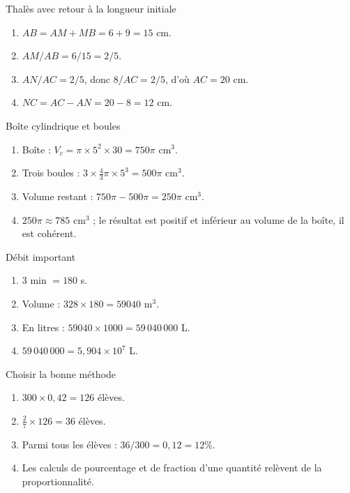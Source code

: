 \documentclass[11pt,a4paper]{article}
\newcounter{corr}
\begin{document}
\begin{corrbox}{Thalès avec retour à la longueur initiale}
\begin{enumerate}
\item $AB=AM+MB=6+9=15$ cm.
\item $AM/AB=6/15=2/5$.
\item $AN/AC=2/5$, donc $8/AC=2/5$, d'où $AC=20$ cm.
\item $NC=AC-AN=20-8=12$ cm.
\end{enumerate}
\end{corrbox}

\begin{corrbox}{Boîte cylindrique et boules}
\begin{enumerate}
\item Boîte : $V_c=\pi\times5^2\times30=750\pi$ cm$^3$.
\item Trois boules : $3\times\frac43\pi\times5^3=500\pi$ cm$^3$.
\item Volume restant : $750\pi-500\pi=250\pi$ cm$^3$.
\item $250\pi\approx785$ cm$^3$ ; le résultat est positif et inférieur au volume de la boîte, il est cohérent.
\end{enumerate}
\end{corrbox}

\begin{corrbox}{Débit important}
\begin{enumerate}
\item $3$ min $=180$ s.
\item Volume : $328\times180=59040$ m$^3$.
\item En litres : $59040\times1000=59\,040\,000$ L.
\item $59\,040\,000=5{,}904\times10^7$ L.
\end{enumerate}
\end{corrbox}

\begin{corrbox}{Choisir la bonne méthode}
\begin{enumerate}
\item $300\times0{,}42=126$ élèves.
\item $\frac27\times126=36$ élèves.
\item Parmi tous les élèves : $36/300=0{,}12=12\%$.
\item Les calculs de pourcentage et de fraction d'une quantité relèvent de la proportionnalité.
\end{enumerate}
\end{corrbox}
\end{document}
